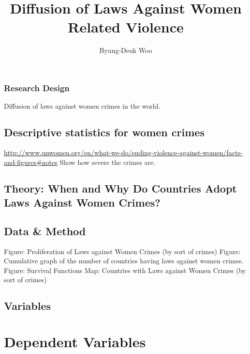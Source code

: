 \documentclass[]{article}
\title{Diffusion of Laws Against Women Related Violence}
\author{Byung-Deuk Woo}
\date{}
\begin{document}
\maketitle

\subsubsection{Research Design}\label{research-design}

Diffusion of laws against women crimes in the world.

\subsection{Descriptive statistics for women
crimes}\label{descriptive-statistics-for-women-crimes}

\url{http://www.unwomen.org/en/what-we-do/ending-violence-against-women/facts-and-figures\#notes}
Show how severe the crimes are.

\subsection{Theory: When and Why Do Countries Adopt Laws Against Women
Crimes?}\label{theory-when-and-why-do-countries-adopt-laws-against-women-crimes}

\subsection{Data \& Method}\label{data-method}

Figure: Proliferation of Laws against Women Crimes (by sort of crimes)
Figure: Cumulative graph of the number of countries having laws against
women crimes. Figure: Survival Functions Map: Countries with Laws
against Women Crimes (by sort of crimes)

\subsection{Variables}\label{variables}

\section{Dependent Variables}\label{dependent-variables}
\end{document}
